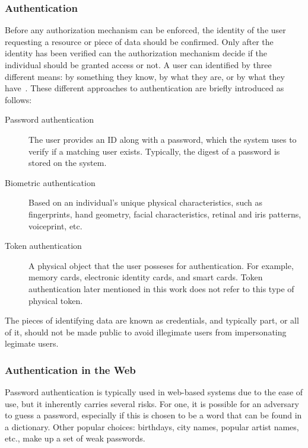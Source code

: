 \documentclass[12pt]{article}
\begin{document}
\subsubsection{Authentication}

Before any authorization mechanism can be enforced, the identity of the user requesting a resource or piece of data should be confirmed. Only after the identity has been verified can the authorization mechanism decide if the individual should be granted access or not. A user can identified by three different means: by something they know, by what they are, or by what they have~\cite{stallings_01}. These different approaches to authentication are briefly introduced as follows:

\begin{description}
\item[Password authentication] The user provides an ID along with a password, which the system uses to verify if a matching user exists. Typically, the digest of a password is stored on the system. 
\item[Biometric authentication] Based on an individual's unique physical characteristics, such as fingerprints, hand geometry, facial characteristics, retinal and iris patterns, voiceprint, etc. 
\item[Token authentication] A physical object that the user posseses for authentication. For example, memory cards, electronic identity cards, and smart cards. Token authentication later mentioned in this work does not refer to this type of physical token.
\end{description}

The pieces of identifying data are known as credentials, and typically part, or all of it, should not be made public to avoid illegimate users from impersonating legimate users. 

\subsubsection{Authentication in the Web}

Password authentication is typically used in web-based systems due to the ease of use, but it inherently carries several risks. For one, it is possible for an adversary to guess a password, especially if this is chosen to be a word that can be found in a dictionary. Other popular choices: birthdays, city names, popular artist names, etc., make up a set of weak passwords.
\end{document}

